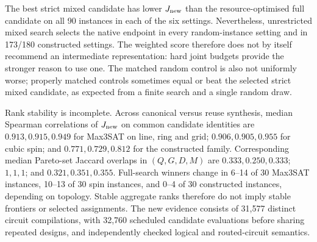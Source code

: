 The best strict mixed candidate has lower $J_{\rm new}$ than the
resource-optimised full candidate on all 90 instances in each of the six
settings. Nevertheless, unrestricted mixed search selects the native
endpoint in every random-instance setting and in 173/180 constructed
settings. The weighted score therefore does not by itself recommend an
intermediate representation: hard joint budgets provide the stronger
reason to use one. The matched random control is also not uniformly worse;
properly matched controls sometimes equal or beat the selected strict
mixed candidate, as expected from a finite search and a single random draw.

Rank stability is incomplete. Across canonical versus reuse synthesis,
median Spearman correlations of $J_{\rm new}$ on common candidate identities
are $0.913,0.915,0.949$ for Max3SAT on line, ring and grid;
$0.906,0.905,0.955$ for cubic spin; and $0.771,0.729,0.812$ for the
constructed family. Corresponding median Pareto-set Jaccard overlaps
in $(Q,G,D,M)$ are $0.333,0.250,0.333$; $1,1,1$; and
$0.321,0.351,0.355$. Full-search winners change in 6--14 of 30 Max3SAT
instances, 10--13 of 30 spin instances, and 0--4 of 30 constructed
instances, depending on topology. Stable aggregate ranks therefore do not
imply stable frontiers or selected assignments. The new evidence consists
of 31,577 distinct circuit compilations, with 32,760 scheduled candidate
evaluations before sharing repeated designs, and independently checked
logical and routed-circuit semantics.
